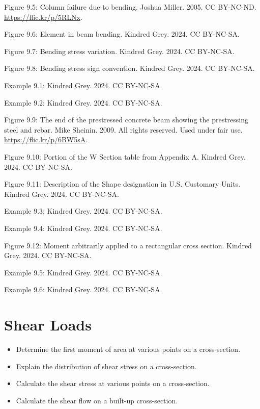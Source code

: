 \documentclass[
  letterpaper,
  DIV=11,
  numbers=noendperiod]{scrreprt}
\providecommand{\tightlist}{%
  \setlength{\itemsep}{0pt}\setlength{\parskip}{0pt}}\usepackage{longtable,booktabs,array}
\theoremstyle{definition}
\theoremstyle{remark}
\begin{document}
Figure 9.5: Column failure due to bending. Joshua Miller. 2005. CC
BY-NC-ND. \url{https://flic.kr/p/5RLNx}.

Figure 9.6: Element in beam bending. Kindred Grey. 2024. CC BY-NC-SA.

Figure 9.7: Bending stress variation. Kindred Grey. 2024. CC BY-NC-SA.

Figure 9.8: Bending stress sign convention. Kindred Grey. 2024. CC
BY-NC-SA.

Example 9.1: Kindred Grey. 2024. CC BY-NC-SA.

Example 9.2: Kindred Grey. 2024. CC BY-NC-SA.

Figure 9.9: The end of the prestressed concrete beam showing the
prestressing steel and rebar. Mike Sheinin. 2009. All rights reserved.
Used under fair use. \url{https://flic.kr/p/6BW5sA}.

Figure 9.10: Portion of the W Section table from Appendix A. Kindred
Grey. 2024. CC BY-NC-SA.

Figure 9.11: Description of the Shape designation in U.S. Customary
Units. Kindred Grey. 2024. CC BY-NC-SA.

Example 9.3: Kindred Grey. 2024. CC BY-NC-SA.

Example 9.4: Kindred Grey. 2024. CC BY-NC-SA.

Figure 9.12: Moment arbitrarily applied to a rectangular cross section.
Kindred Grey. 2024. CC BY-NC-SA.

Example 9.5: Kindred Grey. 2024. CC BY-NC-SA.

Example 9.6: Kindred Grey. 2024. CC BY-NC-SA.


\chapter{Shear Loads}\label{sec-shear-loads}

\begin{tcolorbox}[enhanced jigsaw, leftrule=.75mm, bottomrule=.15mm, opacityback=0, opacitybacktitle=0.6, colframe=quarto-callout-note-color-frame, toprule=.15mm, colbacktitle=quarto-callout-note-color!10!white, coltitle=black, bottomtitle=1mm, title={Learning Objectives}, titlerule=0mm, toptitle=1mm, colback=white, rightrule=.15mm, left=2mm, arc=.35mm, breakable]

\begin{itemize}
\tightlist
\item
  Determine the first moment of area at various points on a
  cross-section.
\item
  Explain the distribution of shear stress on a cross-section.
\item
  Calculate the shear stress at various points on a cross-section.
\item
  Calculate the shear flow on a built-up cross-section.
\end{itemize}

\end{tcolorbox}
\end{document}
